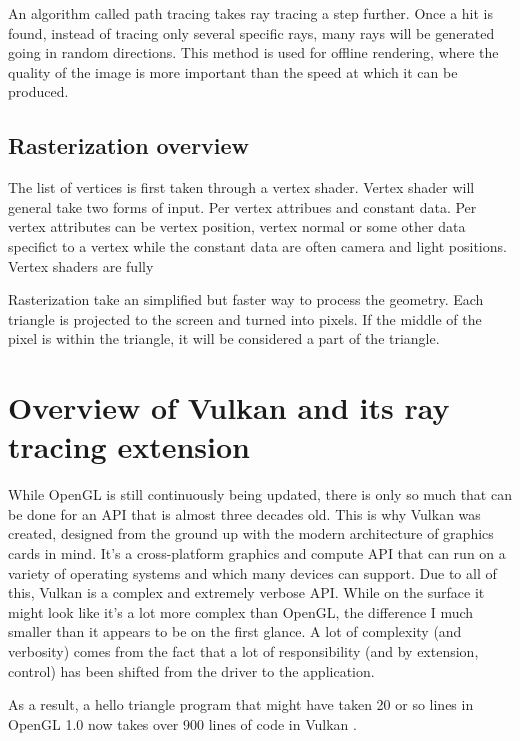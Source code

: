 \documentclass[times, utf8, zavrsni, numeric]{fer}
\begin{document}
An algorithm called path tracing takes ray tracing a step further. Once a hit is found, instead of tracing only several specific rays, many rays will be generated going in random directions. This method is used for offline rendering, where the quality of the image is more important than the speed at which it can be produced.

\section{Rasterization overview}
The list of vertices is first taken through a vertex shader. Vertex shader will general take two forms of input. Per vertex attribues and constant data. Per vertex attributes can be vertex position, vertex normal or some other data specifict to a vertex while the constant data are often camera and light positions. Vertex shaders are fully 

Rasterization take an simplified but faster way to process the geometry. Each triangle is projected to the screen and turned into pixels. If the middle of the pixel is within the triangle, it will be considered a part of the triangle.

\chapter{Overview of Vulkan and its ray tracing extension}
While OpenGL is still continuously being updated, there is only so much that can be done for an API that is almost three decades old. This is why Vulkan was created, designed from the ground up with the modern architecture of graphics cards in mind. It's a cross-platform graphics and compute API that can run on a variety of operating systems and which many devices can support. Due to all of this, Vulkan is a complex and extremely verbose API. While on the surface it might look like it's a lot more complex than OpenGL, the difference I much smaller than it appears to be on the first glance. A lot of complexity (and verbosity) comes from the fact that a lot of responsibility (and by extension, control) has been shifted from the driver to the application.

As a result, a hello triangle program that might have taken 20 or so lines in OpenGL 1.0 now takes over 900 lines of code in Vulkan \cite{vulkan_tutorial}.

\end{document}
